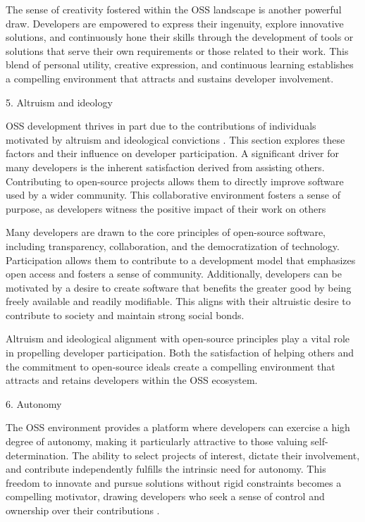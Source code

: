 The sense of creativity fostered within the OSS landscape is another powerful draw. Developers are empowered to express their ingenuity, explore innovative solutions, and continuously hone their skills through the development of tools or solutions that serve their own requirements or those related to their work. This blend of personal utility, creative expression, and continuous learning establishes a compelling environment that attracts and sustains developer involvement.

5. Altruism and ideology

OSS development thrives in part due to the contributions of individuals motivated by altruism and ideological convictions \cite{07zhao2024openrank,08zhang2024paid,10wu2007empirical,11gerosa2021shifting,13li2012leadership,16ke2008motivations,17alexander2002working,18oreg2008exploring}. This section explores these factors and their influence on developer participation. A significant driver for many developers is the inherent satisfaction derived from assisting others. Contributing to open-source projects allows them to directly improve software used by a wider community. This collaborative environment fosters a sense of purpose, as developers witness the positive impact of their work on others

Many developers are drawn to  the core principles of open-source software, including transparency, collaboration, and the democratization of technology. Participation allows them to contribute to a development model that emphasizes open access and fosters a sense of community.  Additionally, developers can be motivated by a desire to create software that benefits the greater good by being freely available and readily modifiable. This aligns with their altruistic desire to contribute to society and maintain strong social bonds.

Altruism and ideological alignment with open-source principles play a vital role in propelling developer participation. Both the satisfaction of helping others and the commitment to open-source ideals create a compelling environment that attracts and retains developers within the OSS ecosystem.

6. Autonomy

The OSS environment provides a platform where developers can exercise a high degree of autonomy, making it particularly attractive to those valuing self-determination. The ability to select projects of interest, dictate their involvement, and contribute independently fulfills the intrinsic need for autonomy. This freedom to innovate and pursue solutions without rigid constraints becomes a compelling motivator, drawing developers who seek a sense of control and ownership over their contributions \cite{16ke2008motivations}.

